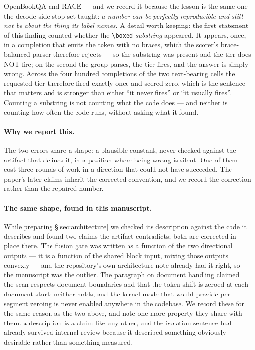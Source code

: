 \documentclass[11pt]{article}
\begin{document}
OpenBookQA and RACE --- and we record it because the lesson is the same one the
decode-side stop set taught: \emph{a number can be perfectly reproducible and still not
be about the thing its label names}. A detail worth keeping: the first statement of
this finding counted whether the \texttt{\textbackslash boxed} \emph{substring}
appeared. It appears, once, in a completion that emits the token with no braces, which
the scorer's brace-balanced parser therefore rejects --- so the substring was present
and the tier does NOT fire; on the second the group parses, the tier fires, and the answer is simply wrong. Across the four hundred completions of the two text-bearing cells the requested tier therefore fired exactly once and scored zero, which is the sentence that matters and is stronger than either ``it never fires'' or ``it usually fires''. Counting a substring is not counting what the code does --- and neither is counting how often the code runs, without asking what it found.

\paragraph{Why we report this.} The two errors share a shape: a plausible constant,
never checked against the artifact that defines it, in a position where being wrong is
silent. One of them cost three rounds of work in a direction that could not have
succeeded. The paper's later claims inherit the corrected convention, and we record the
correction rather than the repaired number.

\paragraph{The same shape, found in this manuscript.} While preparing
\S\ref{sec:architecture} we checked its description against the code it describes and
found two claims the artifact contradicts; both are corrected in place there. The fusion
gate was written as a function of the two directional outputs --- it is a function of the
shared block input, mixing those outputs convexly --- and the repository's own
architecture note already had it right, so the manuscript was the outlier. The paragraph
on document handling claimed the scan respects document boundaries and that the token
shift is zeroed at each document start; neither holds, and the kernel mode that would
provide per-segment zeroing is never enabled anywhere in the codebase. We record these
for the same reason as the two above, and note one more property they share with them: a
description is a claim like any other, and the isolation sentence had already survived
internal review because it described something obviously desirable rather than something
measured.
\end{document}

